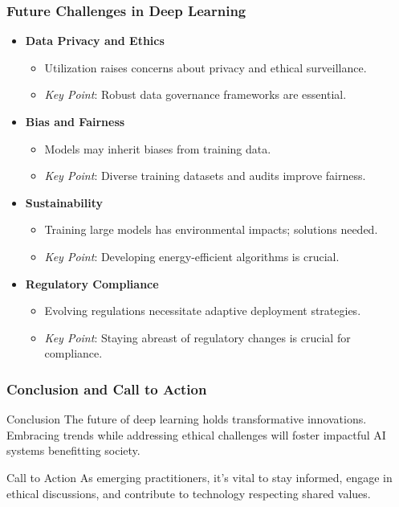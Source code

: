 \documentclass[aspectratio=169]{beamer}
\begin{document}
\begin{frame}[fragile]
    \frametitle{Future Challenges in Deep Learning}
    \begin{itemize}
        \item \textbf{Data Privacy and Ethics}
        \begin{itemize}
            \item Utilization raises concerns about privacy and ethical surveillance.
            \item \textit{Key Point}: Robust data governance frameworks are essential.
        \end{itemize}

        \item \textbf{Bias and Fairness}
        \begin{itemize}
            \item Models may inherit biases from training data.
            \item \textit{Key Point}: Diverse training datasets and audits improve fairness.
        \end{itemize}

        \item \textbf{Sustainability}
        \begin{itemize}
            \item Training large models has environmental impacts; solutions needed.
            \item \textit{Key Point}: Developing energy-efficient algorithms is crucial.
        \end{itemize}

        \item \textbf{Regulatory Compliance}
        \begin{itemize}
            \item Evolving regulations necessitate adaptive deployment strategies.
            \item \textit{Key Point}: Staying abreast of regulatory changes is crucial for compliance.
        \end{itemize}
    \end{itemize}
\end{frame}

\begin{frame}[fragile]
    \frametitle{Conclusion and Call to Action}
    \begin{block}{Conclusion}
        The future of deep learning holds transformative innovations. Embracing trends while addressing ethical challenges will foster impactful AI systems benefitting society.
    \end{block}

    \begin{block}{Call to Action}
        As emerging practitioners, it's vital to stay informed, engage in ethical discussions, and contribute to technology respecting shared values.
    \end{block}
\end{frame}
\end{document}
